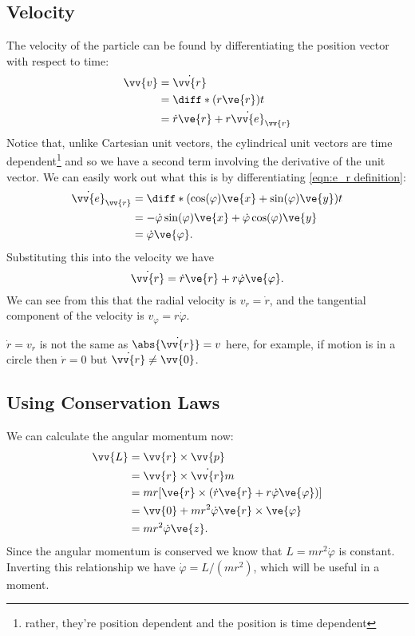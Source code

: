 \documentclass[fleqn]{NotesClass}
\newcommand*{\vedot}[1]{\dot{\vv{e}}_{\vv{#1}}}
\begin{document}
    \subsection{Velocity}
    The velocity of the particle can be found by differentiating the position vector with respect to time:
    \begin{align}
        \vv{v} &= \dot{\vv{r}}\\
        &= \diff*{(r\ve{r})}{t}\\
        &= \dot{r}\ve{r} + r\vedot{r}
    \end{align}
    Notice that, unlike Cartesian unit vectors, the cylindrical unit vectors are time dependent\footnote{rather, they're position dependent and the position is time dependent} and so we have a second term involving the derivative of the unit vector.
    We can easily work out what this is by differentiating \cref{eqn:e_r definition}:
    \begin{align}
        \vedot{r} &= \diff*{(\cos(\varphi)\ve{x} + \sin(\varphi)\ve{y})}{t}\\
        &= -\dot{\varphi}\sin(\varphi)\ve{x} + \dot{\varphi}\cos(\varphi)\ve{y}\\
        &= \dot{\varphi}\ve{\varphi}.
    \end{align}
    Substituting this into the velocity we have
    \begin{equation}
        \dot{\vv{r}} = \dot{r}\ve{r} + r\dot{\varphi}\ve{\varphi}.
    \end{equation}
    We can see from this that the radial velocity is \(v_r = \dot{r}\), and the tangential component of the velocity is \(v_\varphi = r\dot{\varphi}\).
    
    \begin{wrn}
        \(\dot{r} = v_r\) is not the same as \(\abs{\dot{\vv{r}}} = v\) here, for example, if motion is in a circle then \(\dot{r} = 0\) but \(\dot{\vv{r}} \ne \vv{0}\).
    \end{wrn}
    
    \subsection{Using Conservation Laws}
    We can calculate the angular momentum now:
    \begin{align}
        \vv{L} &= \vv{r}\times\vv{p}\\
        &= \vv{r}\times\dot{\vv{r}}m\\
        &= mr[\ve{r} \times (\dot{r}\ve{r} + r\dot{\varphi}\ve{\varphi})]\\
        &= \vv{0} + mr^2\dot{\varphi}\ve{r}\times\ve{\varphi}\\
        &= mr^2\dot{\varphi}\ve{z}.
    \end{align}
    Since the angular momentum is conserved we know that \(L = mr^2\dot{\varphi}\) is constant.
    Inverting this relationship we have \(\dot{\varphi} = L/(mr^2)\), which will be useful in a moment.
    
\end{document}
